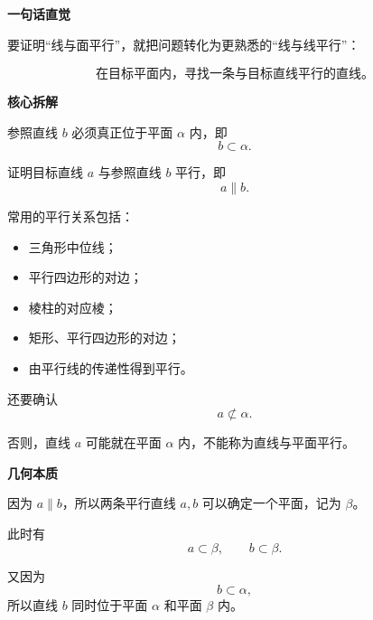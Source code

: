 \begin{explanationbox}
    \textbf{\textcolor{CExplanation}{一句话直觉}}

    要证明“线与面平行”，就把问题转化为更熟悉的“线与线平行”：

    \[
        \text{在目标平面内，寻找一条与目标直线平行的直线。}
    \]

    \medskip
    \textbf{\textcolor{CExplanation}{核心拆解}}

    \begin{description}[
        style=nextline,
        leftmargin=2.8em,
        labelsep=0.5em,
        itemsep=0.45em
    ]
        \item[\textbf{要点一（找参照线）：}]
        参照直线 $b$ 必须真正位于平面 $\alpha$ 内，即
        \[
            b\subset\alpha.
        \]

        \item[\textbf{要点二（证线线平行）：}]
        证明目标直线 $a$ 与参照直线 $b$ 平行，即
        \[
            a\parallel b.
        \]

        常用的平行关系包括：

        \begin{itemize}[leftmargin=*, itemsep=0.25em]
            \item 三角形中位线；
            \item 平行四边形的对边；
            \item 棱柱的对应棱；
            \item 矩形、平行四边形的对边；
            \item 由平行线的传递性得到平行。
        \end{itemize}

        \item[\textbf{要点三（排除线在面内）：}]
        还要确认
        \[
            a\not\subset\alpha.
        \]

        否则，直线 $a$ 可能就在平面 $\alpha$ 内，不能称为直线与平面平行。
    \end{description}

    \medskip
    \textbf{\textcolor{CExplanation}{几何本质}}

    因为 $a\parallel b$，所以两条平行直线 $a,b$ 可以确定一个平面，记为 $\beta$。

    此时有
    \[
        a\subset\beta,
        \qquad
        b\subset\beta.
    \]

    又因为
    \[
        b\subset\alpha,
    \]
    所以直线 $b$ 同时位于平面 $\alpha$ 和平面 $\beta$ 内。


\end{explanationbox}
